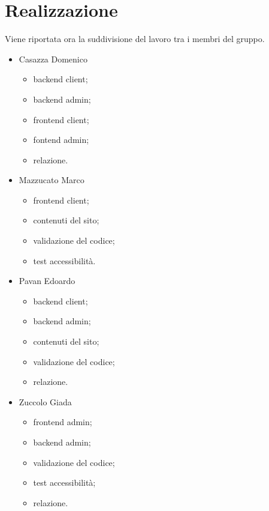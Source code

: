 \section{Realizzazione}
Viene riportata ora la suddivisione del lavoro tra i membri del gruppo.
\begin{itemize}
	\item Casazza Domenico
	\begin{itemize}
		\item backend client;
		\item backend admin;
		\item frontend client;
		\item fontend admin;
		\item relazione.
	\end{itemize}
	\item Mazzucato Marco
	\begin{itemize}
		\item frontend client;
		\item contenuti del sito;
		\item validazione del codice;
		\item test accessibilità.
	\end{itemize}	
	\item Pavan Edoardo
	\begin{itemize}
		\item backend client;
		\item backend admin;
		\item contenuti del sito;
		\item validazione del codice;
		\item relazione.
	\end{itemize}
	\item Zuccolo Giada
	\begin{itemize}
		\item frontend admin;
		\item backend admin;
		\item validazione del codice;
		\item test accessibilità;
		\item relazione.
	\end{itemize}
\end{itemize}